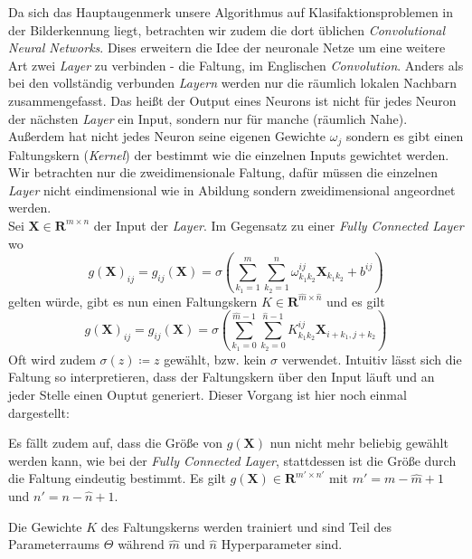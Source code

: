 \documentclass[]{scrartcl}
\newcommand{\R}{\mathbf{R}}
\begin{document}
			Da sich das Hauptaugenmerk unsere Algorithmus auf Klasifaktionsproblemen in der Bilderkennung liegt, betrachten wir zudem die dort üblichen \textit{Convolutional Neural Networks}.
			Dises erweitern die Idee der neuronale Netze um eine weitere Art zwei \textit{Layer} zu verbinden - die Faltung, im Englischen \textit{Convolution}.
			Anders als bei den vollständig verbunden \textit{Layern} werden nur die räumlich lokalen Nachbarn zusammengefasst. Das heißt der Output eines Neurons ist nicht für jedes Neuron der nächsten
			\textit{Layer} ein Input, sondern nur für manche (räumlich Nahe). Außerdem hat nicht jedes Neuron seine eigenen Gewichte $\omega_j$ sondern es gibt einen Faltungskern (\textit{Kernel})
			der bestimmt wie die einzelnen Inputs gewichtet werden.
			Wir betrachten nur die zweidimensionale Faltung, dafür müssen die einzelnen \textit{Layer} nicht eindimensional wie in Abildung %
			sondern zweidimensional angeordnet werden. \\
			Sei $\mathbf{X} \in \R^{m \times n}$ der Input der \textit{Layer}. Im Gegensatz zu einer \textit{Fully Connected Layer} wo\\
			$$g(\mathbf{X})_{ij} = g_{ij}(\mathbf{X}) = \sigma(\sum_{k_1=1}^m \sum_{k_2=1}^n \omega_{k_1k_2}^{ij}\mathbf{X}_{k_1k_2} + b^{ij})$$
			gelten würde, gibt es nun einen Faltungskern $K \in \R^{\hat{m} \times \hat{n}}$ und es gilt
			$$g(\mathbf{X})_{ij} = g_{ij}(\mathbf{X}) = \sigma(\sum_{k_1=0}^{\hat{m} - 1} \sum_{k_2=0}^{\hat{n} - 1} K_{k_1k_2}^{ij} \mathbf{X}_{i + k_1, j + k_2} )$$
			Oft wird zudem $\sigma(z) \coloneqq z$ gewählt, bzw. kein $\sigma$ verwendet.
			Intuitiv lässt sich die Faltung so interpretieren, dass der Faltungskern über den Input läuft und an jeder Stelle einen Ouptut generiert. Dieser Vorgang ist hier noch einmal dargestellt:


			Es fällt zudem auf, dass die Größe von $g(\mathbf{X})$ nun nicht mehr beliebig gewählt werden kann, wie bei der \textit{Fully Connected Layer}, stattdessen ist die Größe durch die Faltung
			eindeutig bestimmt. Es gilt $g(\mathbf{X}) \in \R^{m' \times n'}$ mit $m' = m - \hat{m} + 1$ und $n' = n - \hat{n} + 1$.

			Die Gewichte $K$ des Faltungskerns werden trainiert und sind Teil des Parameterraums $\Theta$ während $\hat{m}$ und $\hat{n}$ Hyperparameter sind.
\end{document}
